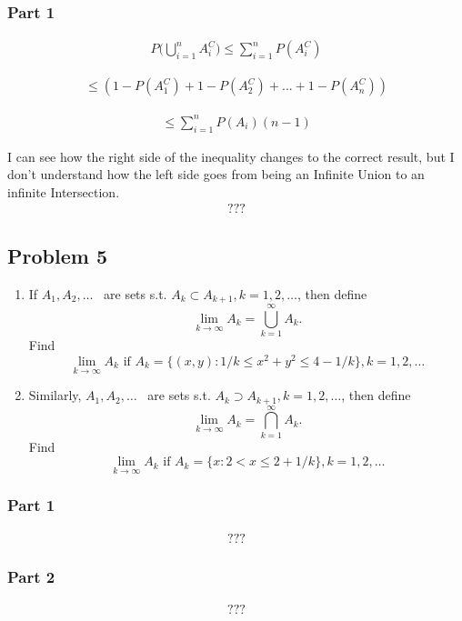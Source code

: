 \documentclass{article}
\begin{document}
\subsubsection*{Part 1}
\begin{align*}
P\Bigg( \bigcup_{i=1}^{n}A_i^C \Bigg) \leq \sum_{i=1}^{n}P(A_i^C)
\end{align*}

\begin{align*}
\leq (1-P(A_1^C) + 1 - P(A_2^C) + ... + 1-P(A_n^C))
\end{align*}

\begin{align*}
\leq \sum_{i=1}^{n} P(A_i)(n-1)
\end{align*}

I can see how the right side of the inequality changes to the correct result, but I don't understand how the left side goes from being an Infinite Union to an infinite Intersection.
\begin{align*}
\boxed{\text{???}}
\end{align*}
\clearpage
\subsection*{Problem 5}
\begin{enumerate}
    \item
      If $A_1,A_2,\dots$ \ are sets s.t. $A_k\subset A_{k+1}, k = 1,2,\dots$, then define
      \[
      \lim_{k \to \infty}A_k = \bigcup_{k=1}^\infty A_k.
      \]
      \noindent Find $$\lim_{k \to \infty}A_k \textrm{ if }A_k = \{(x,y):1/k \leq x^2 + y^2 \leq 4-1/k\}, k=1,2,\dots$$
    \item
      Similarly, $A_1,A_2,\dots$ \ are sets s.t. $A_k\supset A_{k+1}, k = 1,2,\dots$, then define
      \[
      \lim_{k \to \infty}A_k = \bigcap_{k=1}^\infty A_k.
      \]
      \noindent Find $$\lim_{k \to \infty}A_k \textrm{ if }A_k = \{x:2<x\leq 2+1/k\}, k=1,2,\dots$$
    \end{enumerate}
\subsubsection*{Part 1}
\begin{align*}
\boxed{\text{???}}
\end{align*}
\subsubsection*{Part 2}
\begin{align*}
\boxed{\text{???}}
\end{align*}
\end{document}
